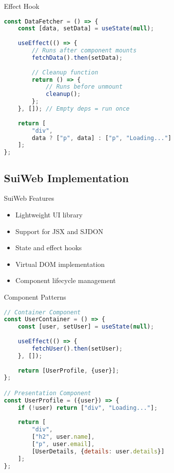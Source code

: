 \begin{KR}{Effect Hook}
\begin{lstlisting}[language=JavaScript, style=basesmol]
const DataFetcher = () => {
    const [data, setData] = useState(null);
    
    useEffect(() => {
        // Runs after component mounts
        fetchData().then(setData);
        
        // Cleanup function
        return () => {
            // Runs before unmount
            cleanup();
        };
    }, []); // Empty deps = run once
    
    return [
        "div",
        data ? ["p", data] : ["p", "Loading..."]
    ];
};
\end{lstlisting}
\end{KR}

\subsection{SuiWeb Implementation}

\begin{concept}{SuiWeb Features}
    \begin{itemize}
        \item Lightweight UI library
        \item Support for JSX and SJDON
        \item State and effect hooks
        \item Virtual DOM implementation
        \item Component lifecycle management
    \end{itemize}
\end{concept}

\begin{KR}{Component Patterns}
\begin{lstlisting}[language=JavaScript, style=basesmol]
// Container Component
const UserContainer = () => {
    const [user, setUser] = useState(null);
    
    useEffect(() => {
        fetchUser().then(setUser);
    }, []);
    
    return [UserProfile, {user}];
};

// Presentation Component
const UserProfile = ({user}) => {
    if (!user) return ["div", "Loading..."];
    
    return [
        "div",
        ["h2", user.name],
        ["p", user.email],
        [UserDetails, {details: user.details}]
    ];
};
\end{lstlisting}
\end{KR}


